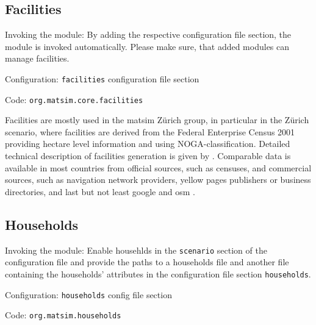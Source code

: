 \subsection{Facilities}
\label{sec:facilities}
\begin{compactitem}
\item Invoking the module: By adding the respective configuration file section, the module is invoked automatically. Please make sure, that added modules can manage facilities.
\item Configuration: \lstinline|facilities| configuration file section
\item Code: \lstinline|org.matsim.core.facilities|
\end{compactitem}

Facilities are mostly used in the \gls{matsim} Zürich group, in particular in the Zürich scenario, where facilities are derived from the Federal Enterprise Census 2001 \citep[][]{SwissEnterpriseCensus_manual_2001} providing hectare level information and using NOGA-classification. Detailed technical description of facilities generation is given by \citet[][]{Meister_TechRep_IVT_2008, Meister_unpub_IVT_2007}. Comparable data is available in most countries from official sources, such as censuses, and commercial sources, such as navigation network providers, yellow pages publishers or business directories, and last but not least google and \gls{osm} \citep[][]{OpenStreetMap_Webpage_2015}.


\subsection{Households}
\label{sec:households}
\begin{compactitem}
\item Invoking the module: Enable househlds in the \lstinline|scenario| section of the configuration file and provide the paths to a households file and another file containing the households' attributes in the configuration file section \lstinline|households|.
\item Configuration: \lstinline|households| config file section
\item Code: \lstinline|org.matsim.households|
\end{compactitem}

